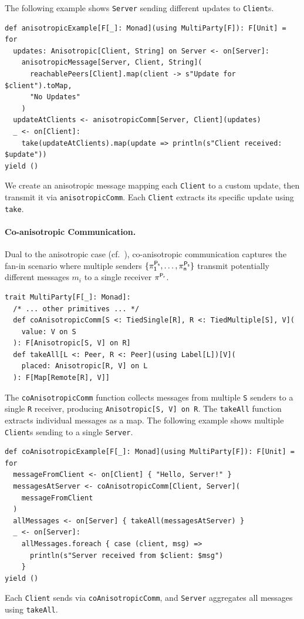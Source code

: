 \documentclass[runningheads]{llncs}
\newcommand{\code}[1]{\lstinline[style=scala3,basicstyle=\ttfamily\small\color{vscLightText}]{#1}}
\begin{document}
The following example shows \code{Server} sending different updates to \code{Client}s.
\begin{lstlisting}[style=scala3]
def anisotropicExample[F[_]: Monad](using MultiParty[F]): F[Unit] = for
  updates: Anisotropic[Client, String] on Server <- on[Server]:
    anisotropicMessage[Server, Client, String](
      reachablePeers[Client].map(client -> s"Update for $client").toMap,
      "No Updates"
    )
  updateAtClients <- anisotropicComm[Server, Client](updates)
  _ <- on[Client]:
    take(updateAtClients).map(update => println(s"Client received: $update")) 
yield ()
\end{lstlisting}
We create an anisotropic message mapping each \code{Client} to a custom update,
then transmit it via \code{anisotropicComm}.
Each \code{Client} extracts its specific update using \code{take}.

\paragraph{Co-anisotropic Communication.}
Dual to the anisotropic case (cf.\ ),
co-anisotropic communication captures the fan-in scenario
where
multiple senders $\{\mathsf{\pi_{1}^{P_s}}, \ldots, \mathsf{\pi_{n}^{P_s}}\}$ transmit potentially different messages $m_i$ to a single receiver $\mathsf{\pi_{}^{P_r}}$.
\begin{lstlisting}[style=scala3]
trait MultiParty[F[_]: Monad]:
  /* ... other primitives ... */
  def coAnisotropicComm[S <: TiedSingle[R], R <: TiedMultiple[S], V](
    value: V on S
  ): F[Anisotropic[S, V] on R]
  def takeAll[L <: Peer, R <: Peer](using Label[L])[V](
    placed: Anisotropic[R, V] on L
  ): F[Map[Remote[R], V]]
\end{lstlisting}
The \code{coAnisotropicComm} function collects messages from multiple \code{S} senders to a single \code{R} receiver,
producing \code{Anisotropic[S, V] on R}.
The \code{takeAll} function extracts individual messages as a map.
%
The following example shows multiple \code{Client}s sending to a single \code{Server}.
\begin{lstlisting}[style=scala3]
def coAnisotropicExample[F[_]: Monad](using MultiParty[F]): F[Unit] = for
  messageFromClient <- on[Client] { "Hello, Server!" }
  messagesAtServer <- coAnisotropicComm[Client, Server](
    messageFromClient
  )
  allMessages <- on[Server] { takeAll(messagesAtServer) }
  _ <- on[Server]:
    allMessages.foreach { case (client, msg) =>
      println(s"Server received from $client: $msg")
    }
yield ()
\end{lstlisting}
Each \code{Client} sends via \code{coAnisotropicComm},
and \code{Server} aggregates all messages using \code{takeAll}.
\end{document}
